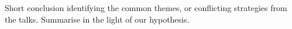  \label{Sect1}







Short conclusion identifying the common themes, or conflicting strategies from the talks.
Summarise in the light of our hypothesis.



